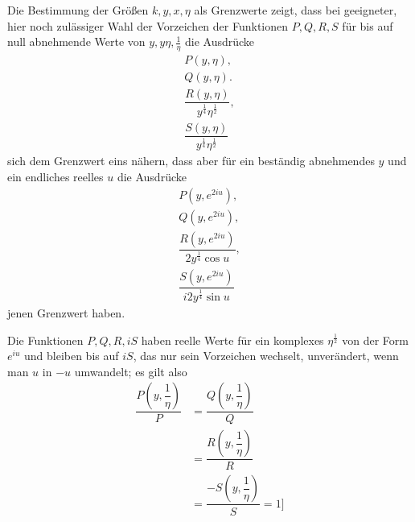 Die Bestimmung der Größen $k,\allowbreak y,\allowbreak x,\allowbreak \eta$ als Grenzwerte zeigt, dass bei geeigneter, hier noch zulässiger Wahl der Vorzeichen der Funktionen $P,\allowbreak Q,\allowbreak R,\allowbreak S$ für bis auf null abnehmende Werte von $y,\allowbreak y\eta,\allowbreak \frac1\eta$ die Ausdrücke
\[
\begin{gathered}P(y,\eta),\\[6pt] Q(y,\eta).\\[6pt]
\dfrac{R(y,\eta)}{y^{\frac14}\eta^{\frac12}},\\[6pt]
\dfrac{S(y,\eta)}{y^{\frac14}\eta^{\frac12}}\end{gathered}
\]
sich dem Grenzwert eins nähern, dass aber für ein beständig abnehmendes $y$ und ein endliches reelles $u$ die Ausdrücke
\[
\begin{gathered}P(y,e^{2iu}),\\[6pt] Q(y,e^{2iu}),\\[6pt]
\dfrac{R(y,e^{2iu})}{2y^{\frac14}\cos u},\\[6pt]
\dfrac{S(y,e^{2iu})}{i2y^{\frac14}\sin u}\end{gathered}
\]
jenen Grenzwert haben.

Die Funktionen $P,\allowbreak Q,\allowbreak R,\allowbreak iS$ haben reelle Werte für ein komplexes $\eta^{\frac12}$ von der Form $e^{iu}$ und bleiben bis auf $iS$, das nur sein Vorzeichen wechselt, unverändert, wenn man $u$ in $-u$ umwandelt; es gilt also
\[
\begin{aligned}\dfrac{P(y,\dfrac1\eta)}P
&=\dfrac{Q(y,\dfrac1\eta)}Q
\\[7pt]&=\dfrac{R(y,\dfrac1\eta)}R
\\[7pt]&=\dfrac{-S(y,\dfrac1\eta)}S=1
\text{]}\end{aligned}
\]

\clearpage
\endgroup
